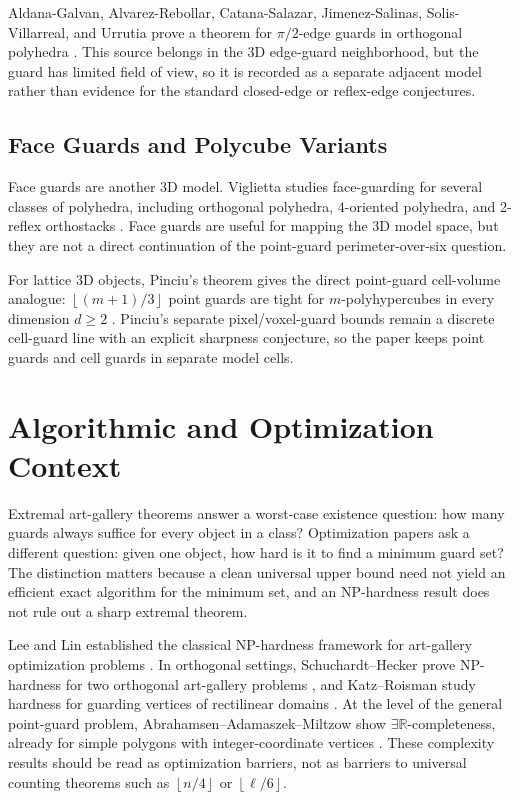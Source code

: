 \documentclass[11pt]{article}
\newcommand{\floor}[1]{\left\lfloor #1 \right\rfloor}
\begin{document}
Aldana-Galvan, Alvarez-Rebollar, Catana-Salazar, Jimenez-Salinas,
Solis-Villarreal, and Urrutia prove a theorem for $\pi/2$-edge guards in
orthogonal polyhedra \cite{AldanaGalvanEtAl2016}.  This source belongs in the
3D edge-guard neighborhood, but the guard has limited field of view, so it is
recorded as a separate adjacent model rather than evidence for the standard
closed-edge or reflex-edge conjectures.

\subsection{Face Guards and Polycube Variants}

Face guards are another 3D model.  Viglietta studies face-guarding for several
classes of polyhedra, including orthogonal polyhedra, 4-oriented polyhedra, and
2-reflex orthostacks \cite{VigliettaFace2014}.  Face guards are useful for
mapping the 3D model space, but they are not a direct continuation of the
point-guard perimeter-over-six question.

For lattice 3D objects, Pinciu's theorem gives the direct point-guard
cell-volume analogue: $\floor{(m+1)/3}$ point guards are tight for
$m$-polyhypercubes in every dimension $d\geq 2$ \cite{Pinciu2015}.  Pinciu's
separate pixel/voxel-guard bounds remain a discrete cell-guard line with an
explicit sharpness conjecture, so the paper keeps point guards and cell guards
in separate model cells.

\section{Algorithmic and Optimization Context}

Extremal art-gallery theorems answer a worst-case existence question: how many
guards always suffice for every object in a class?  Optimization papers ask a
different question: given one object, how hard is it to find a minimum guard
set?  The distinction matters because a clean universal upper bound need not
yield an efficient exact algorithm for the minimum set, and an NP-hardness
result does not rule out a sharp extremal theorem.

Lee and Lin established the classical NP-hardness framework for art-gallery
optimization problems \cite{LeeLin1986}.  In orthogonal settings,
Schuchardt--Hecker prove NP-hardness for two orthogonal art-gallery problems
\cite{SchuchardtHecker1995}, and Katz--Roisman study hardness for guarding
vertices of rectilinear domains \cite{KatzRoisman2008}.  At the level of the
general point-guard problem, Abrahamsen--Adamaszek--Miltzow show
$\exists\mathbb{R}$-completeness, already for simple polygons with
integer-coordinate vertices \cite[Theorem~1]{AbrahamsenAdamaszekMiltzow2022}.
These complexity results should be read as optimization barriers, not as
barriers to universal counting theorems such as $\floor{n/4}$ or
$\floor{\ell/6}$.
\end{document}
